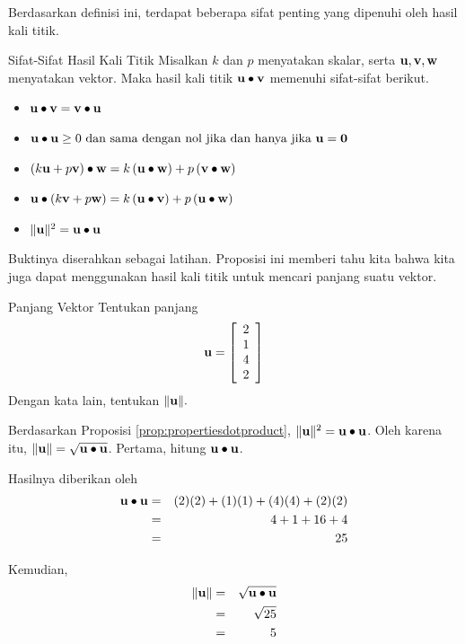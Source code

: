 Berdasarkan definisi ini, terdapat beberapa sifat penting yang dipenuhi
oleh hasil kali titik.

\begin{proposition}{Sifat-Sifat Hasil Kali Titik}\label{prop:propertiesdotproduct}
Misalkan $k $ dan $p $ menyatakan skalar, serta $\mathbf{u},\mathbf{v},\mathbf{w}$ menyatakan vektor.
Maka hasil kali titik $\mathbf{u} \bullet \mathbf{v}$ memenuhi sifat-sifat berikut.
\begin{itemize}
\item
$\mathbf{u}\bullet \mathbf{v}= \mathbf{v}\bullet \mathbf{u} $
\item
$\mathbf{u}\bullet \mathbf{u}\geq 0 \mbox{ dan sama dengan nol jika dan hanya jika }\mathbf{u}=\mathbf{0}$
\item
$\left( k\mathbf{u}+p\mathbf{v}\right) \bullet \mathbf{w}=k\left( \mathbf{u}\bullet \mathbf{w}\right) +p\left( \mathbf{v}\bullet \mathbf{w}\right)$
\item
$\mathbf{u}\bullet\left( k\mathbf{v}+p\mathbf{w}\right) =k\left(
\mathbf{u}\bullet \mathbf{v}\right) +p\left( \mathbf{u}\bullet \mathbf{w}\right)$
\item
$\| \mathbf{u}\| ^{2}=\mathbf{u}\bullet \mathbf{u} $
\end{itemize}
\end{proposition}

Buktinya diserahkan sebagai latihan. Proposisi ini memberi tahu kita bahwa kita juga dapat menggunakan hasil kali titik untuk mencari panjang suatu vektor.

\begin{example}{Panjang Vektor}\label{exa:dotproductlength}
Tentukan panjang
\begin{equation*}
\mathbf{u}
=
\left[
\begin{array}{r}
2 \\
1 \\
4 \\
2
\end{array}
\right]
\end{equation*}
Dengan kata lain, tentukan $\| \mathbf{u} \| .$ 
\end{example}

\begin{solution}
Berdasarkan Proposisi \ref{prop:propertiesdotproduct}, $\| \mathbf{u} \| ^{2} = \mathbf{u} \bullet \mathbf{u}$.
Oleh karena itu, $\| \mathbf{u} \| = \sqrt {\mathbf{u} \bullet \mathbf{u}}$.
Pertama, hitung $\mathbf{u} \bullet \mathbf{u}$.

Hasilnya diberikan oleh
\begin{eqnarray*}
\mathbf{u} \bullet \mathbf{u}
&=&
(2)(2) + (1)(1) + (4)(4) + (2)(2) \\
&=&
4 + 1 + 16 + 4 \\
&=&
25
\end{eqnarray*}

Kemudian,
\begin{eqnarray*}
\| \mathbf{u} \|
&=& \sqrt {\mathbf{u} \bullet \mathbf{u}} \\
&=& \sqrt{25} \\
&=& 5
\end{eqnarray*}
\end{solution}

